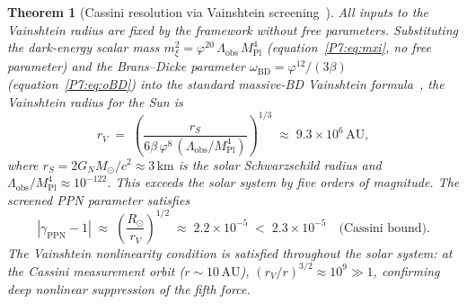\documentclass[11pt,a4paper]{article}
\newtheorem{theorem}{Theorem}[section]
\theoremstyle{definition}
\theoremstyle{remark}
\newcommand{\vp}{\varphi}
\newcommand{\MPl}{M_{\mathrm{Pl}}}
\newcommand{\oBD}{\omega_{\mathrm{BD}}}
\begin{document}
\begin{theorem}[Cassini resolution via Vainshtein screening~\cite{Vainshtein1972}]
\label{P7:thm:cassini}
All inputs to the Vainshtein radius are fixed by the framework without
free parameters.  Substituting the dark-energy scalar mass
$m_\xi^2 = \vp^{20}\,\Lambda_{\mathrm{obs}}\,\MPl^4$
(equation~\eqref{P7:eq:mxi}, no free parameter) and the Brans--Dicke parameter
$\oBD = \vp^{12}/(3\beta)$ (equation~\eqref{P7:eq:oBD}) into the standard
massive-BD Vainshtein formula~\cite{Vainshtein1972,Dvali2000},
the Vainshtein radius for the Sun is
\begin{equation}
  \boxed{r_V
  \;=\; \left(\frac{r_S}{6\beta\,\vp^8\,
        (\Lambda_{\mathrm{obs}}/\MPl^4)}\right)^{\!1/3}
  \;\approx\; 9.3\times10^6\,\mathrm{AU},}
  \label{P7:eq:rV_exact}
\end{equation}
where $r_S = 2G_N M_\odot/c^2\approx3\,\mathrm{km}$ is the solar
Schwarzschild radius and $\Lambda_{\mathrm{obs}}/\MPl^4\approx10^{-122}$.
This exceeds the solar system by five orders of magnitude.
The screened PPN parameter satisfies
\begin{equation}
  |\gamma_{\mathrm{PPN}}-1|
  \;\approx\;\left(\frac{R_\odot}{r_V}\right)^{1/2}
  \;\approx\; 2.2\times10^{-5}
  \;<\; 2.3\times10^{-5} \quad\text{(Cassini bound).}
  \label{P7:eq:gamma_PPN}
\end{equation}
The Vainshtein nonlinearity condition is satisfied throughout the solar
system: at the Cassini measurement orbit ($r\sim10\,\mathrm{AU}$),
$(r_V/r)^{3/2}\approx10^{9}\gg1$, confirming deep nonlinear
suppression of the fifth force.
\end{theorem}
\end{document}
